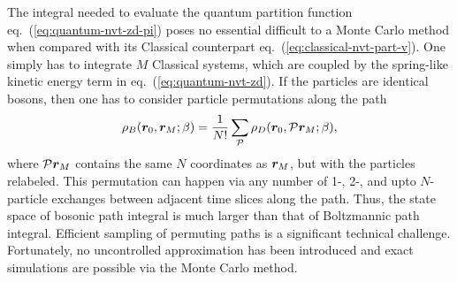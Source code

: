 The integral needed to evaluate the quantum partition function eq.~(\ref{eq:quantum-nvt-zd-pi}) poses no essential difficult to a Monte Carlo method when compared with its Classical counterpart eq.~(\ref{eq:classical-nvt-part-v}). One simply has to integrate $M$ Classical systems, which are coupled by the spring-like kinetic energy term in eq.~(\ref{eq:quantum-nvt-zd}). 
If the particles are identical bosons, then one has to consider particle permutations along the path%
\begin{align}
\rho_B(\boldsymbol{r}_0,\boldsymbol{r}_M;\beta) = \frac{1}{N!}\sum\limits_{\mathcal{P}} \rho_D(\boldsymbol{r}_0, \mathcal{P}\boldsymbol{r}_M;\beta),
\end{align}
where $\mathcal{P}\boldsymbol{r}_M$ contains the same $N$ coordinates as $\boldsymbol{r}_M$, but with the particles relabeled. This permutation can happen via any number of 1-, 2-, and upto $N$-particle exchanges between adjacent time slices along the path. Thus, the state space of bosonic path integral is much larger than that of Boltzmannic path integral. Efficient sampling of permuting paths is a significant technical challenge. Fortunately, no uncontrolled approximation has been introduced and exact simulations are possible via the Monte Carlo method.

